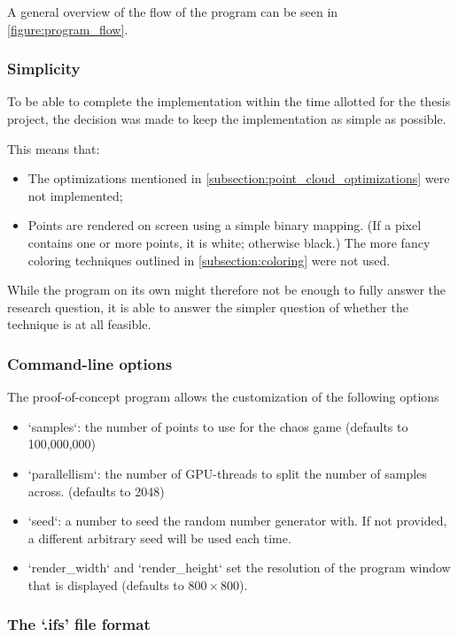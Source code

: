 \documentclass[11pt]{article}
\begin{document}
A general overview of the flow of the program can be seen in \autoref{figure:program_flow}.

\subsubsection{Simplicity}
\label{sec:orgb5aa0b0}

To be able to complete the implementation within the time allotted for the thesis project,
the decision was made to keep the implementation as simple as possible.

This means that:

\begin{itemize}
\item The optimizations mentioned in \autoref{subsection:point_cloud_optimizations} were not implemented;
\item Points are rendered on screen using a simple binary mapping. (If a pixel contains one or more points, it is white; otherwise black.)
The more fancy coloring techniques outlined in \autoref{subsection:coloring} were not used.
\end{itemize}

While the program on its own might therefore not be enough to fully answer the research question,
it is able to answer the simpler question of whether the technique is at all feasible.

\subsubsection{Command-line options}
\label{sec:org1084a42}

The proof-of-concept program allows the customization of the following options

\begin{itemize}
\item `samples`: the number of points to use for the chaos game (defaults to 100,000,000)
\item `parallellism`: the number of GPU-threads to split the number of samples across. (defaults to 2048)
\item `seed`: a number to seed the random number generator with. If not provided, a different arbitrary seed will be used each time.
\item `render\_width` and `render\_height` set the resolution of the program window that is displayed (defaults to \(800 \times 800\)).
\end{itemize}

\subsubsection{The `.ifs' file format}
\label{sec:org953ebb1}
\end{document}
